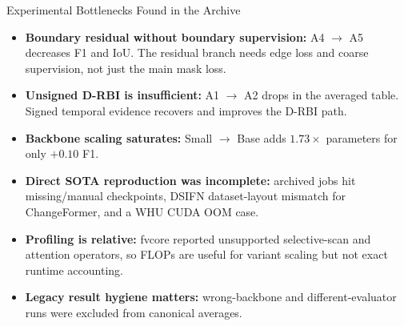 \begin{frame}{Experimental Bottlenecks Found in the Archive}
    \small
    \begin{itemize}
        \item \textbf{Boundary residual without boundary supervision:} A4 \(\rightarrow\) A5 decreases F1 and IoU. The residual branch needs edge loss and coarse supervision, not just the main mask loss.
        \item \textbf{Unsigned D-RBI is insufficient:} A1 \(\rightarrow\) A2 drops in the averaged table. Signed temporal evidence recovers and improves the D-RBI path.
        \item \textbf{Backbone scaling saturates:} Small \(\rightarrow\) Base adds \(1.73\times\) parameters for only \(+0.10\) F1.
        \item \textbf{Direct SOTA reproduction was incomplete:} archived jobs hit missing/manual checkpoints, DSIFN dataset-layout mismatch for ChangeFormer, and a WHU CUDA OOM case.
        \item \textbf{Profiling is relative:} fvcore reported unsupported selective-scan and attention operators, so FLOPs are useful for variant scaling but not exact runtime accounting.
        \item \textbf{Legacy result hygiene matters:} wrong-backbone and different-evaluator runs were excluded from canonical averages.
    \end{itemize}
\end{frame}
